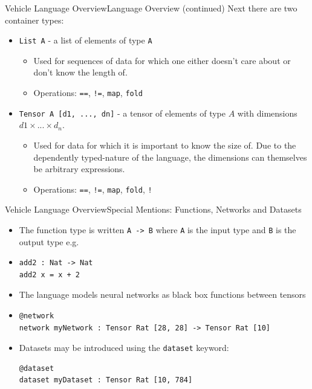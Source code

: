 \documentclass[t,compress,aspectratio=169]{beamer}
\newcommand{\vehicle}[1]{{\texttt{#1}}}
\begin{document}
\begin{frame}{Vehicle Language Overview}{Language Overview (continued)}
Next there are two container types:
\begin{itemize}
\item \vehicle{List A} - a list of elements of type \vehicle{A}
\begin{itemize}
\item Used for sequences of data for which one either doesn't care about or don't know the length of.
\item Operations: \vehicle{==}, \vehicle{!=}, \vehicle{map}, \vehicle{fold}
\end{itemize}
\item \vehicle{Tensor A [d1, ..., dn]} - a tensor of elements of type $A$ with dimensions $d1 \times ... \times d_n$.
\begin{itemize}
\item Used for data for which it is important to know the size of. Due to the dependently typed-nature of the language, the dimensions can themselves be arbitrary expressions.
\item Operations: \vehicle{==}, \vehicle{!=}, \vehicle{map}, \vehicle{fold}, \vehicle{!}
\end{itemize}
\end{itemize}
\end{frame}

\begin{frame}[containsverbatim]{Vehicle Language Overview}{Special Mentions: Functions, Networks and Datasets}

\begin{itemize}
    \item The function type is written  \vehicle{A -> B} where \vehicle{A} is the input type and \vehicle{B} is the output type e.g.
    \item[]\begin{verbatim}
add2 : Nat -> Nat
add2 x = x + 2
\end{verbatim}
\end{itemize}

\begin{itemize}
    \item The language models neural networks as black box functions between tensors
    \item[]\begin{verbatim}
@network
network myNetwork : Tensor Rat [28, 28] -> Tensor Rat [10]
\end{verbatim}
\end{itemize}

\begin{itemize}
    \item Datasets may be introduced using the \vehicle{dataset} keyword:
\begin{verbatim}
@dataset
dataset myDataset : Tensor Rat [10, 784]
\end{verbatim}
\end{itemize}



\end{frame}
\end{document}
